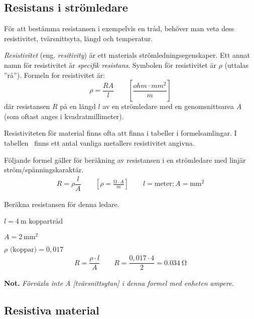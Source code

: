 \subsection{Resistans i strömledare}

För att bestämma resistansen i exempelvis en tråd, behöver man veta dess 
resistivitet, tvärsnittsyta, längd och temperatur.

\emph{Resistivitet} (eng. \emph{resitivity}) är ett materials
strömledningsegenskaper.
Ett annat namn för resistivitet är \emph{specifik resistans}.
Symbolen för resistivitet är \(\rho\) (uttalas ''rå'').
Formeln for resistivitet är:
\[\rho = \dfrac{R A}{l}\qquad \left[\dfrac{ohm \cdot mm^2}{m}\right]\]
där resistansen \(R\) på en längd \(l\) av en strömledare med en
genomsnittsarea \(A\) (som oftast anges i kvadratmillimeter).

Resistiviteten för material finns ofta att finna i tabeller i formelsamlingar.
I tabellen~ finns ett antal vanliga metallers
resistivitet angivna.

Följande formel gäller för beräkning av resistansen i en strömledare med linjär
ström/spänningskaraktär.
\[\begin{array}{c}
    R = \rho \dfrac{l}{A} \qquad \left[\rho = \frac{\unit{\ohm} \cdot A}{m} \right] \qquad l=\text{meter}; A=\unit{\milli\metre\squared}
\end{array}\]
\noindent
\begin{exempelbox}
Beräkna resistansen för denna ledare.

\(l = \qty{4}{\metre}\) koppartråd

\(A = \qty{2}{\milli\metre\squared}\)

\(\rho \text{ (koppar)} = 0,017\)
\tcblower
\noindent
\[\begin{array}{c}
R = \dfrac{\rho \cdot l}{A} \qquad R = \dfrac{0,017 \cdot 4}{2} = \qty{0,034}{\ohm}
\end{array}\]

\noindent
\textbf{Not.} \emph{Förväxla inte A [tvärsnittsytan] i denna formel med enheten ampere.}
\end{exempelbox}

\subsection{Resistiva material}

